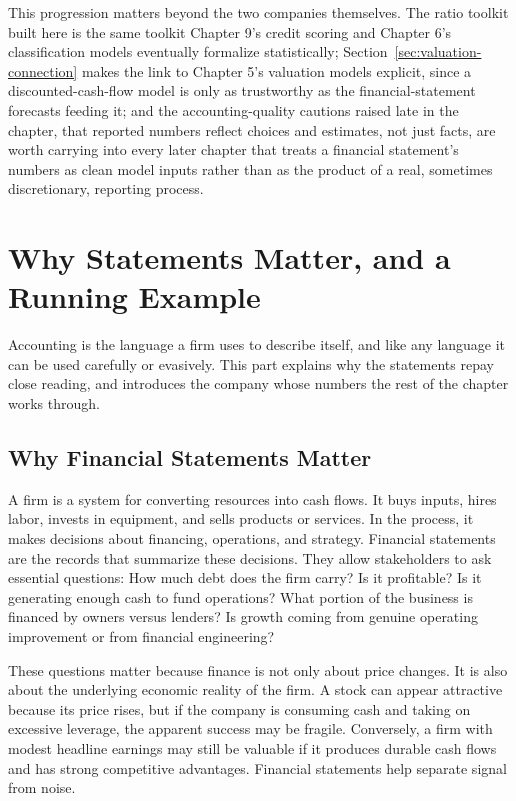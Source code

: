\documentclass[../ai_in_finance]{subfiles}
\begin{document}
This progression matters beyond the two companies themselves. The ratio toolkit built here is the same toolkit Chapter 9's credit scoring and Chapter 6's classification models eventually formalize statistically; Section~\ref{sec:valuation-connection} makes the link to Chapter 5's valuation models explicit, since a discounted-cash-flow model is only as trustworthy as the financial-statement forecasts feeding it; and the accounting-quality cautions raised late in the chapter, that reported numbers reflect choices and estimates, not just facts, are worth carrying into every later chapter that treats a financial statement's numbers as clean model inputs rather than as the product of a real, sometimes discretionary, reporting process.

\section{Why Statements Matter, and a Running Example}

Accounting is the language a firm uses to describe itself, and like any language it can be used carefully or evasively. This part explains why the statements repay close reading, and introduces the company whose numbers the rest of the chapter works through.

\subsection{Why Financial Statements Matter}

A firm is a system for converting resources into cash flows. It buys inputs, hires labor, invests in equipment, and sells products or services. In the process, it makes decisions about financing, operations, and strategy. Financial statements are the records that summarize these decisions. They allow stakeholders to ask essential questions: How much debt does the firm carry? Is it profitable? Is it generating enough cash to fund operations? What portion of the business is financed by owners versus lenders? Is growth coming from genuine operating improvement or from financial engineering?

These questions matter because finance is not only about price changes. It is also about the underlying economic reality of the firm. A stock can appear attractive because its price rises, but if the company is consuming cash and taking on excessive leverage, the apparent success may be fragile. Conversely, a firm with modest headline earnings may still be valuable if it produces durable cash flows and has strong competitive advantages. Financial statements help separate signal from noise.
\end{document}
